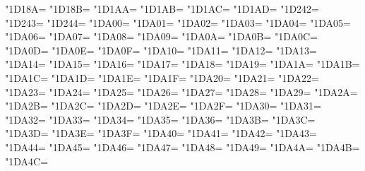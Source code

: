 \XeTeXcharclass"1D18A=\KclassCM
\XeTeXcharclass"1D18B=\KclassCM
\XeTeXcharclass"1D1AA=\KclassCM
\XeTeXcharclass"1D1AB=\KclassCM
\XeTeXcharclass"1D1AC=\KclassCM
\XeTeXcharclass"1D1AD=\KclassCM
\XeTeXcharclass"1D242=\KclassCM
\XeTeXcharclass"1D243=\KclassCM
\XeTeXcharclass"1D244=\KclassCM
\XeTeXcharclass"1DA00=\KclassCM
\XeTeXcharclass"1DA01=\KclassCM
\XeTeXcharclass"1DA02=\KclassCM
\XeTeXcharclass"1DA03=\KclassCM
\XeTeXcharclass"1DA04=\KclassCM
\XeTeXcharclass"1DA05=\KclassCM
\XeTeXcharclass"1DA06=\KclassCM
\XeTeXcharclass"1DA07=\KclassCM
\XeTeXcharclass"1DA08=\KclassCM
\XeTeXcharclass"1DA09=\KclassCM
\XeTeXcharclass"1DA0A=\KclassCM
\XeTeXcharclass"1DA0B=\KclassCM
\XeTeXcharclass"1DA0C=\KclassCM
\XeTeXcharclass"1DA0D=\KclassCM
\XeTeXcharclass"1DA0E=\KclassCM
\XeTeXcharclass"1DA0F=\KclassCM
\XeTeXcharclass"1DA10=\KclassCM
\XeTeXcharclass"1DA11=\KclassCM
\XeTeXcharclass"1DA12=\KclassCM
\XeTeXcharclass"1DA13=\KclassCM
\XeTeXcharclass"1DA14=\KclassCM
\XeTeXcharclass"1DA15=\KclassCM
\XeTeXcharclass"1DA16=\KclassCM
\XeTeXcharclass"1DA17=\KclassCM
\XeTeXcharclass"1DA18=\KclassCM
\XeTeXcharclass"1DA19=\KclassCM
\XeTeXcharclass"1DA1A=\KclassCM
\XeTeXcharclass"1DA1B=\KclassCM
\XeTeXcharclass"1DA1C=\KclassCM
\XeTeXcharclass"1DA1D=\KclassCM
\XeTeXcharclass"1DA1E=\KclassCM
\XeTeXcharclass"1DA1F=\KclassCM
\XeTeXcharclass"1DA20=\KclassCM
\XeTeXcharclass"1DA21=\KclassCM
\XeTeXcharclass"1DA22=\KclassCM
\XeTeXcharclass"1DA23=\KclassCM
\XeTeXcharclass"1DA24=\KclassCM
\XeTeXcharclass"1DA25=\KclassCM
\XeTeXcharclass"1DA26=\KclassCM
\XeTeXcharclass"1DA27=\KclassCM
\XeTeXcharclass"1DA28=\KclassCM
\XeTeXcharclass"1DA29=\KclassCM
\XeTeXcharclass"1DA2A=\KclassCM
\XeTeXcharclass"1DA2B=\KclassCM
\XeTeXcharclass"1DA2C=\KclassCM
\XeTeXcharclass"1DA2D=\KclassCM
\XeTeXcharclass"1DA2E=\KclassCM
\XeTeXcharclass"1DA2F=\KclassCM
\XeTeXcharclass"1DA30=\KclassCM
\XeTeXcharclass"1DA31=\KclassCM
\XeTeXcharclass"1DA32=\KclassCM
\XeTeXcharclass"1DA33=\KclassCM
\XeTeXcharclass"1DA34=\KclassCM
\XeTeXcharclass"1DA35=\KclassCM
\XeTeXcharclass"1DA36=\KclassCM
\XeTeXcharclass"1DA3B=\KclassCM
\XeTeXcharclass"1DA3C=\KclassCM
\XeTeXcharclass"1DA3D=\KclassCM
\XeTeXcharclass"1DA3E=\KclassCM
\XeTeXcharclass"1DA3F=\KclassCM
\XeTeXcharclass"1DA40=\KclassCM
\XeTeXcharclass"1DA41=\KclassCM
\XeTeXcharclass"1DA42=\KclassCM
\XeTeXcharclass"1DA43=\KclassCM
\XeTeXcharclass"1DA44=\KclassCM
\XeTeXcharclass"1DA45=\KclassCM
\XeTeXcharclass"1DA46=\KclassCM
\XeTeXcharclass"1DA47=\KclassCM
\XeTeXcharclass"1DA48=\KclassCM
\XeTeXcharclass"1DA49=\KclassCM
\XeTeXcharclass"1DA4A=\KclassCM
\XeTeXcharclass"1DA4B=\KclassCM
\XeTeXcharclass"1DA4C=\KclassCM
